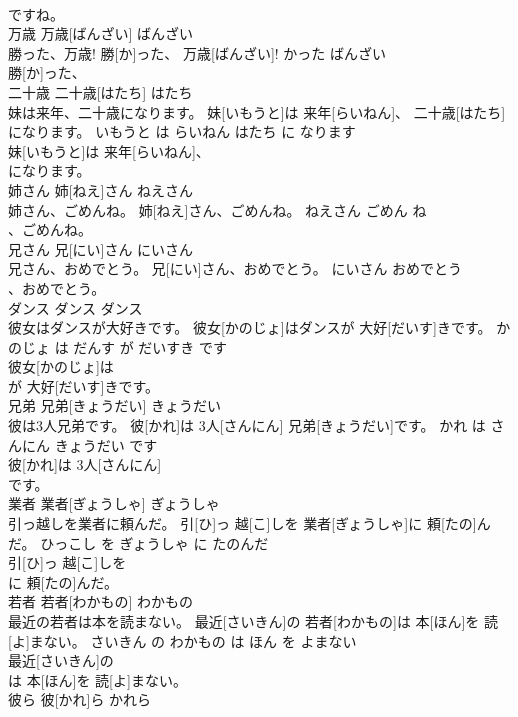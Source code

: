 \documentclass[8pt]{extreport}
\begin{document}
\begin{CJK}{UTF8}{min}
\\	ですね。		
\\	万歳	万歳[ばんざい]	ばんざい	
\\	勝った、万歳!	勝[か]った、 万歳[ばんざい]!	かった ばんざい	
\\	勝[か]った、
\\	二十歳	二十歳[はたち]	はたち	
\\	妹は来年、二十歳になります。	妹[いもうと]は 来年[らいねん]、 二十歳[はたち]になります。	いもうと は らいねん はたち に なります	
\\	妹[いもうと]は 来年[らいねん]、
\\	になります。		
\\	姉さん	姉[ねえ]さん	ねえさん	
\\	姉さん、ごめんね。	姉[ねえ]さん、ごめんね。	ねえさん ごめん ね	
\\	、ごめんね。		
\\	兄さん	兄[にい]さん	にいさん	
\\	兄さん、おめでとう。	兄[にい]さん、おめでとう。	にいさん おめでとう	
\\	、おめでとう。		
\\	ダンス	ダンス	ダンス	
\\	彼女はダンスが大好きです。	彼女[かのじょ]はダンスが 大好[だいす]きです。	かのじょ は だんす が だいすき です	
\\	彼女[かのじょ]は
\\	が 大好[だいす]きです。		
\\	兄弟	兄弟[きょうだい]	きょうだい	
\\	彼は3人兄弟です。	彼[かれ]は 3人[さんにん] 兄弟[きょうだい]です。	かれ は さんにん きょうだい です	
\\	彼[かれ]は 3人[さんにん]
\\	です。		
\\	業者	業者[ぎょうしゃ]	ぎょうしゃ	
\\	引っ越しを業者に頼んだ。	引[ひ]っ 越[こ]しを 業者[ぎょうしゃ]に 頼[たの]んだ。	ひっこし を ぎょうしゃ に たのんだ	
\\	引[ひ]っ 越[こ]しを
\\	に 頼[たの]んだ。		
\\	若者	若者[わかもの]	わかもの	
\\	最近の若者は本を読まない。	最近[さいきん]の 若者[わかもの]は 本[ほん]を 読[よ]まない。	さいきん の わかもの は ほん を よまない	
\\	最近[さいきん]の
\\	は 本[ほん]を 読[よ]まない。		
\\	彼ら	彼[かれ]ら	かれら	

\end{CJK}
\end{document}
